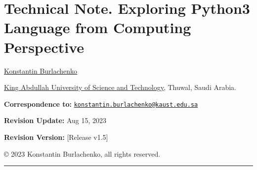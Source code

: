 \documentclass[
]{article}
\author{}
\date{}
\begin{document}
\hypertarget{technical-note-exploring-python3-language-from-computing-perspective}{%
\section{\texorpdfstring{Technical Note. Exploring Python3 Language from
Computing Perspective
}{Technical Note. Exploring Python3 Language from Computing Perspective }}\label{technical-note-exploring-python3-language-from-computing-perspective}}

\href{https://burlachenkok.github.io/}{Konstantin Burlachenko}

\href{https://www.kaust.edu.sa/en}{King Abdullah University of Science
and Technology}, Thuwal, Saudi Arabia.

\textbf{Correspondence to:}
\href{mailto:konstantin.burlachenko@kaust.edu.sa}{\nolinkurl{konstantin.burlachenko@kaust.edu.sa}}

\textbf{Revision Update:} Aug 15, 2023

\textbf{Revision Version:} {[}Release v1.5{]}

© 2023 Konstantin Burlachenko, all rights reserved.

\begin{center}\rule{0.5\linewidth}{0.5pt}\end{center}
\end{document}
